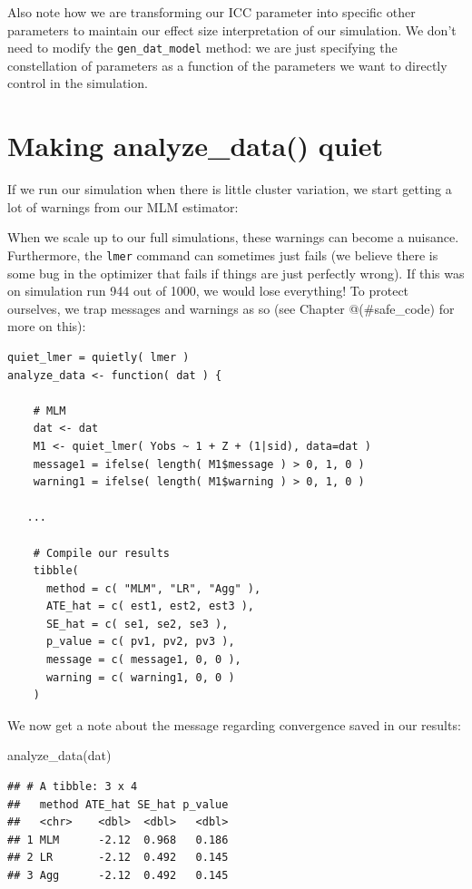 \documentclass[
]{book}
\newenvironment{Shaded}{\begin{snugshade}}{\end{snugshade}}
\newcommand{\FunctionTok}[1]{\textcolor[rgb]{0.00,0.00,0.00}{#1}}
\newcommand{\NormalTok}[1]{#1}
\begin{document}
Also note how we are transforming our ICC parameter into specific other parameters to maintain our effect size interpretation of our
simulation.
We don't need to modify the \texttt{gen\_dat\_model} method: we are just specifying the constellation of parameters as a function of the parameters we want to directly control in the simulation.

\hypertarget{making-analyze_data-quiet}{%
\section{Making analyze\_data() quiet}\label{making-analyze_data-quiet}}

If we run our simulation when there is little cluster variation, we start getting a lot of warnings from our MLM estimator:

When we scale up to our full simulations, these warnings can become a nuisance.
Furthermore, the \texttt{lmer} command can sometimes just fails (we believe there is some bug in the optimizer that fails if things are just perfectly wrong).
If this was on simulation run 944 out of 1000, we would lose everything!
To protect ourselves, we trap messages and warnings as so (see Chapter @(\#safe\_code) for more on this):

\begin{verbatim}
quiet_lmer = quietly( lmer )
analyze_data <- function( dat ) {
    
    # MLM
    dat <- dat
    M1 <- quiet_lmer( Yobs ~ 1 + Z + (1|sid), data=dat )
    message1 = ifelse( length( M1$message ) > 0, 1, 0 )
    warning1 = ifelse( length( M1$warning ) > 0, 1, 0 )

   ...

    # Compile our results
    tibble( 
      method = c( "MLM", "LR", "Agg" ),
      ATE_hat = c( est1, est2, est3 ),
      SE_hat = c( se1, se2, se3 ),
      p_value = c( pv1, pv2, pv3 ),
      message = c( message1, 0, 0 ),
      warning = c( warning1, 0, 0 )
    )
\end{verbatim}

We now get a note about the message regarding convergence saved in our results:

\begin{Shaded}
\begin{Highlighting}[]
\FunctionTok{analyze\_data}\NormalTok{(dat)}
\end{Highlighting}
\end{Shaded}

\begin{verbatim}
## # A tibble: 3 x 4
##   method ATE_hat SE_hat p_value
##   <chr>    <dbl>  <dbl>   <dbl>
## 1 MLM      -2.12  0.968   0.186
## 2 LR       -2.12  0.492   0.145
## 3 Agg      -2.12  0.492   0.145
\end{verbatim}
\end{document}
